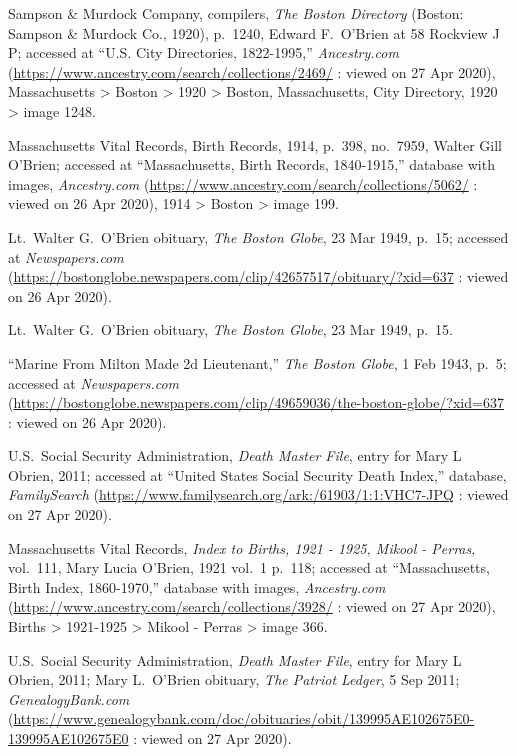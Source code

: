 \begin{thebibliography}{999}
Sampson \& Murdock Company, compilers, \textit{The Boston Directory} (Boston: Sampson \& Murdock Co., 1920), p.\ 1240, Edward F.\ O'Brien at 58 Rockview J P; accessed at ``U.S. City Directories, 1822-1995,'' \textit{Ancestry.com} (\url{https://www.ancestry.com/search/collections/2469/} : viewed on 27 Apr 2020), Massachusetts > Boston > 1920 > Boston, Massachusetts, City Directory, 1920 > image 1248.

Massachusetts Vital Records, Birth Records, 1914, p.\ 398, no.\ 7959, Walter Gill O'Brien; accessed at ``Massachusetts, Birth Records, 1840-1915,'' database with images, \textit{Ancestry.com} (\url{https://www.ancestry.com/search/collections/5062/} : viewed on 26 Apr 2020), 1914 > Boston > image 199.

Lt.\ Walter G.\ O'Brien obituary, \textit{The Boston Globe}, 23 Mar 1949, p.\ 15; accessed at \textit{Newspapers.com} (\url{https://bostonglobe.newspapers.com/clip/42657517/obituary/?xid=637} : viewed on 26 Apr 2020).

Lt.\ Walter G.\ O'Brien obituary, \textit{The Boston Globe}, 23 Mar 1949, p.\ 15.

``Marine From Milton Made 2d Lieutenant,'' \textit{The Boston Globe}, 1 Feb 1943, p.\ 5; accessed at \textit{Newspapers.com} (\url{https://bostonglobe.newspapers.com/clip/49659036/the-boston-globe/?xid=637} : viewed on 26 Apr 2020).

U.S.\ Social Security Administration, \textit{Death Master File}, entry for Mary L Obrien, 2011; accessed at ``United States Social Security Death Index,'' database, \textit{FamilySearch} (\url{https://www.familysearch.org/ark:/61903/1:1:VHC7-JPQ} : viewed on 27 Apr 2020).

Massachusetts Vital Records, \textit{Index to Births, 1921 - 1925, Mikool - Perras}, vol.\ 111, Mary Lucia O'Brien, 1921 vol.\ 1 p.\ 118; accessed at ``Massachusetts, Birth Index, 1860-1970,'' database with images, \textit{Ancestry.com} (\url{https://www.ancestry.com/search/collections/3928/} : viewed on 27 Apr 2020), Births > 1921-1925 > Mikool - Perras > image 366.

U.S.\ Social Security Administration, \textit{Death Master File}, entry for Mary L Obrien, 2011; Mary L.\ O'Brien obituary, \textit{The Patriot Ledger}, 5 Sep 2011; \textit{GenealogyBank.com} (\url{https://www.genealogybank.com/doc/obituaries/obit/139995AE102675E0-139995AE102675E0} : viewed on 27 Apr 2020).


\end{thebibliography}
